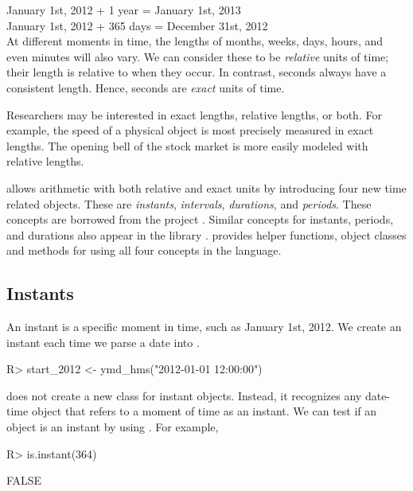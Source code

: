 \documentclass[article]{jss}
\begin{document}
January 1st, 2012 + 1 year = January 1st, 2013\\
January 1st, 2012 + 365 days = December 31st,  2012\\

At different moments in time, the lengths of months, weeks, days, hours, and even minutes will also vary. We can consider these to be \emph{relative} units of time; their length is relative to when they occur. In contrast, seconds always have a consistent length. Hence, seconds are \emph{exact} units of time.

Researchers may be interested in exact lengths, relative lengths, or both. For example, the speed of a physical object is most precisely measured in exact lengths. The opening bell of the stock market is more easily modeled with relative lengths.

 allows arithmetic with both relative and exact units by introducing four new time related objects. These are \emph{instants}, \emph{intervals}, \emph{durations}, and \emph{periods}. These concepts are borrowed from the  project \citep{jodatime}. Similar concepts for instants, periods, and durations also appear in the  library  \citep{boost}.  provides helper functions, object classes and methods for using all four concepts in the  language.

\subsection{Instants}
\label{sec:instants}

An instant is a specific moment in time, such as January 1st, 2012. We create an instant each time we parse a date into . \\

\begin{CodeInput}
R> start_2012 <- ymd_hms("2012-01-01 12:00:00")
\end{CodeInput}

 does not create a new class for instant objects. Instead, it recognizes any date-time object that refers to a moment of time as an instant. We can test if an object is an instant by using . For example,

\begin{CodeInput}
R> is.instant(364)
\end{CodeInput}
\begin{CodeOutput}
[1] FALSE
\end{CodeOutput}
\end{document}
